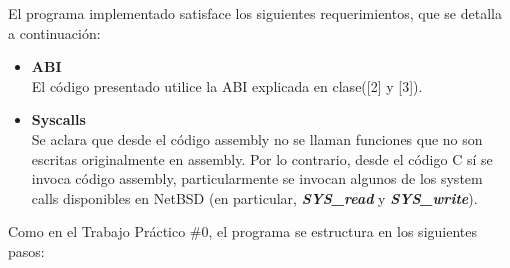 \documentclass[11pt,a4paper]{article}
\begin{document}
El programa implementado satisface los siguientes requerimientos, que se detalla a continuación:
\begin{itemize}
	\item{\textbf{ABI}}\\
	 El código presentado utilice la ABI explicada en clase([2] y [3]).
	\item{\textbf{Syscalls}}\\
	Se aclara que desde el código assembly no se llaman funciones que no son escritas originalmente en assembly. Por lo contrario, desde el código C sí se invoca código assembly, particularmente se invocan algunos de los system calls disponibles en NetBSD (en particular, \textit{\textbf{SYS\_read}} y \textit{\textbf{SYS\_write}}).
\end{itemize}

Como en el Trabajo Práctico \#0, el programa se estructura en los siguientes pasos:
\end{document}
